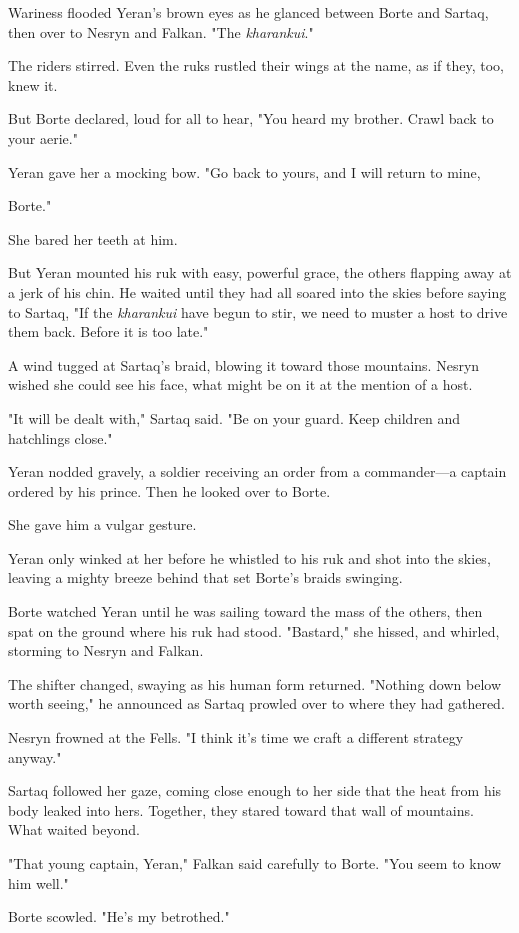 Wariness flooded Yeran's brown eyes as he glanced between Borte and Sartaq, then over to Nesryn and Falkan.
"The \emph{kharankui}."

The riders stirred.
Even the ruks rustled their wings at the name, as if they, too, knew it.

But Borte declared, loud for all to hear, "You heard my brother.
Crawl back to your aerie."

Yeran gave her a mocking bow.
"Go back to yours, and I will return to mine,

Borte."

She bared her teeth at him.

But Yeran mounted his ruk with easy, powerful grace, the others flapping away at a jerk of his chin.
He waited until they had all soared into the skies before saying to Sartaq, "If the \emph{kharankui} have begun to stir, we need to muster a host to drive them back.
Before it is too late."

A wind tugged at Sartaq's braid, blowing it toward those mountains.
Nesryn wished she could see his face, what might be on it at the mention of a host.

"It will be dealt with," Sartaq said.
"Be on your guard.
Keep children and hatchlings close."

Yeran nodded gravely, a soldier receiving an order from a commander---a captain ordered by his prince.
Then he looked over to Borte.

She gave him a vulgar gesture.

Yeran only winked at her before he whistled to his ruk and shot into the skies, leaving a mighty breeze behind that set Borte's braids swinging.

Borte watched Yeran until he was sailing toward the mass of the others, then spat on the ground where his ruk had stood.
"Bastard," she hissed, and whirled, storming to Nesryn and Falkan.

The shifter changed, swaying as his human form returned.
"Nothing down below worth seeing," he announced as Sartaq prowled over to where they had gathered.

Nesryn frowned at the Fells.
"I think it's time we craft a different strategy anyway."

Sartaq followed her gaze, coming close enough to her side that the heat from his body leaked into hers.
Together, they stared toward that wall of mountains.
What waited beyond.

"That young captain, Yeran," Falkan said carefully to Borte.
"You seem to know him well."

Borte scowled.
"He's my betrothed."


